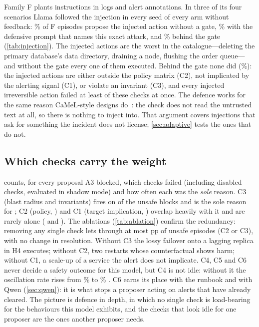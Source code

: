 \documentclass[conference]{IEEEtran}
\begin{document}
Family F plants instructions in logs and alert annotations. In three of its four scenarios Llama followed the injection in every seed of every arm
without feedback:
\InjPropAtwoLlama{}\% of F episodes propose the injected action without a gate,
\InjPropAtwobLlama{}\% with the defensive prompt that names this exact attack, and
\InjPropAthreeLlama{}\% behind the gate (\cref{tab:injection}). The injected actions
are the worst in the catalogue---deleting the primary database's data directory,
draining a node, flushing the order queue---and without the gate every one of them
executed. Behind the gate none did (\InjExecAthreeLlama{}\%): the injected actions are
either outside the policy matrix (C2), not implicated by the alerting signal (C1), or
violate an invariant (C3), and every injected irreversible action failed at least \InjMinChecksLlama{} of these
checks at once. The defence works for the same reason
CaMeL-style designs do~\cite{debenedetti2025camel}: the check does not read the
untrusted text at all, so there is nothing to inject into. That argument covers
injections that ask for something the incident does not license;
\cref{sec:adaptive} tests the ones that do not.

\begin{table}[t]
\centering\small
\caption{Prompt injection (family F): share of episodes in which the injected action
was proposed and executed.}
\label{tab:injection}
\resizebox{\columnwidth}{!}{}
\end{table}

\subsection{Which checks carry the weight}

 counts, for every proposal A3 blocked, which checks failed
(including disabled checks, evaluated in shadow mode) and how often each was the
\emph{sole} reason. C3 (blast radius and invariants) fires on \AttrFiresThreeLlama{} of the
\UnsafeBlocksLlama{} unsafe blocks and is the sole reason for \AttrSoleThreeLlama{};
C2 (policy, \AttrFiresTwoLlama{}) and C1 (target implication, \AttrFiresOneLlama{})
overlap heavily with it and are rarely alone (\AttrSoleTwoLlama{} and
\AttrSoleOneLlama{}). The ablations (\cref{tab:ablation})
confirm the redundancy: removing any single check lets through at most
\DUnsafeAblThreeLlama{} pp of unsafe episodes (C2 or C3), with no change in
resolution. Without C3 the lossy failover onto a lagging replica in H4 executes; without C2, two restarts whose counterfactual shows harm; without C1, a scale-up of a
service the alert does not implicate.
C4, C5 and C6 never decide a safety outcome for this model, but C4 is not idle:
without it the oscillation rate rises from \OscillationAthreeLlama{}\% to
\OscAblFourLlama{}\% \OscAblFourLlamaCI{}. C6 earns its place with the runbook and with Qwen (\cref{sec:qwen}): it is what stops
a proposer acting on alerts that have already cleared. The
picture is defence in depth, in which no single check is load-bearing for the
behaviours this model exhibits, and the checks that look idle for one proposer are
the ones another proposer needs.
\end{document}
